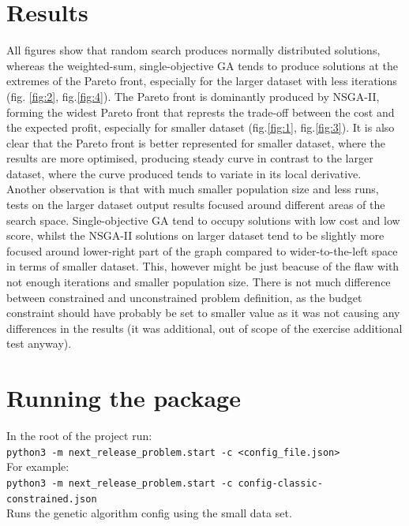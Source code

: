 \documentclass[12pt]{article}
\begin{document}
\section{Results}
All figures show that random search produces normally distributed solutions, whereas the weighted-sum, single-objective GA tends to produce solutions at the extremes of the Pareto front, especially for the larger dataset with less iterations (fig. \ref{fig:2}, fig.\ref{fig:4}). The Pareto front is dominantly produced by NSGA-II, forming the widest Pareto front that represts the trade-off between the cost and the expected profit, especially for smaller dataset (fig.\ref{fig:1}, fig.\ref{fig:3}). It is also clear that the Pareto front is better represented for smaller dataset, where the results are more optimised, producing steady curve in contrast to the larger dataset, where the curve produced tends to variate in its local derivative. Another observation is that with much smaller population size and less runs, tests on the larger dataset output results focused around different areas of the search space. Single-objective GA tend to occupy solutions with low cost and low score, whilst the NSGA-II solutions on larger dataset tend to be slightly more focused around lower-right part of the graph compared to wider-to-the-left space in terms of smaller dataset. This, however might be just beacuse of the flaw with not enough iterations and smaller population size. There is not much difference between constrained and unconstrained problem definition, as the budget constraint should have probably be set to smaller value as it was not causing any differences in the results (it was additional, out of scope of the exercise additional test anyway).

\section{Running the package}
In the root of the project run:\\
\texttt{python3 -m next\_release\_problem.start -c <config\_file.json>}\\
For example:\\
\texttt{python3 -m next\_release\_problem.start -c config-classic-constrained.json}\\
Runs the genetic algorithm config using the small data set.
\end{document}
